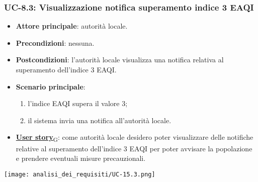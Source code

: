 \subsubsection{UC-8.3: Visualizzazione notifica superamento indice 3 EAQI}
\begin{itemize}
	\item \textbf{Attore principale}: autorità locale.
	\item \textbf{Precondizioni}: nessuna.
	\item \textbf{Postcondizioni}: l'autorità locale visualizza una notifica relativa al superamento dell'indice 3 EAQI.
	\item \textbf{Scenario principale}:
	      \begin{enumerate}
		      \item l'indice EAQI supera il valore 3;
		      \item il sistema invia una notifica all'autorità locale.
	      \end{enumerate}
	\item \href{https://7last.github.io/docs/pb/documentazione-interna/glossario\#user-story}{\textbf{User story}\textsubscript{G}}:
	      come autorità locale desidero poter visualizzare delle notifiche relative al superamento dell'indice 3 EAQI
	      per poter avvisare la popolazione e prendere eventuali misure precauzionali.
\end{itemize}
\begin{center}
	\texttt{[image: analisi\_dei\_requisiti/UC-15.3.png]}
\end{center}


